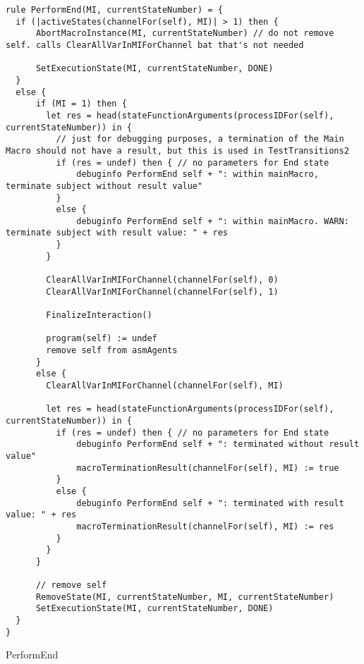 \begin{listing}[H]
\begin{verbatim}
rule PerformEnd(MI, currentStateNumber) = {
  if (|activeStates(channelFor(self), MI)| > 1) then {
      AbortMacroInstance(MI, currentStateNumber) // do not remove self. calls ClearAllVarInMIForChannel bat that's not needed

      SetExecutionState(MI, currentStateNumber, DONE)
  }
  else {
      if (MI = 1) then {
        let res = head(stateFunctionArguments(processIDFor(self), currentStateNumber)) in {
          // just for debugging purposes, a termination of the Main Macro should not have a result, but this is used in TestTransitions2
          if (res = undef) then { // no parameters for End state
              debuginfo PerformEnd self + ": within mainMacro, terminate subject without result value"
          }
          else {
              debuginfo PerformEnd self + ": within mainMacro. WARN: terminate subject with result value: " + res
          }
        }

        ClearAllVarInMIForChannel(channelFor(self), 0)
        ClearAllVarInMIForChannel(channelFor(self), 1)

        FinalizeInteraction()

        program(self) := undef
        remove self from asmAgents
      }
      else {
        ClearAllVarInMIForChannel(channelFor(self), MI)

        let res = head(stateFunctionArguments(processIDFor(self), currentStateNumber)) in {
          if (res = undef) then { // no parameters for End state
              debuginfo PerformEnd self + ": terminated without result value"
              macroTerminationResult(channelFor(self), MI) := true
          }
          else {
              debuginfo PerformEnd self + ": terminated with result value: " + res
              macroTerminationResult(channelFor(self), MI) := res
          }
        }
      }

      // remove self
      RemoveState(MI, currentStateNumber, MI, currentStateNumber)
      SetExecutionState(MI, currentStateNumber, DONE)
  }
}
\end{verbatim}
\caption{PerformEnd}
\label{lst:asm:PerformEnd}
\end{listing}






